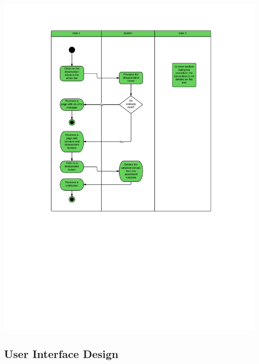 \includegraphics[scale=0.7]{images/UnilateralDeassociation}

\newpage
\subsection{User Interface Design}

